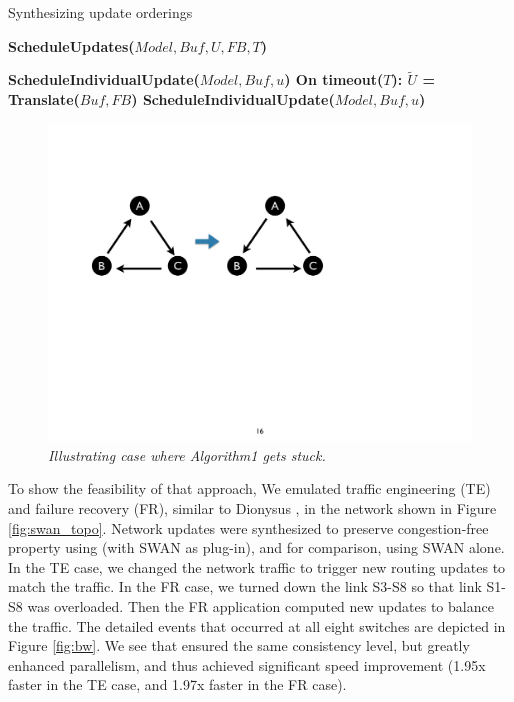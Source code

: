 \begin{algorithm}[t]
  \small
\caption{Synthesizing update orderings}
\bf{ScheduleUpdates}($Model, Buf, U, FB, T$)
\begin{algorithmic} 
        \State \bf{ScheduleIndividualUpdate($Model, Buf, u$)}
\EndFor
\State 
\State \bf{On timeout($T$):}
\State $\tilde{U}$ = \bf{Translate($Buf, FB$)}
        \State \bf{ScheduleIndividualUpdate($Model, Buf, u$)}
\EndFor
\label{alg:synthesize}
\end{algorithmic}  
\end{algorithm}

\begin{figure}[!ht]
  \centering
  \includegraphics[width=0.7\columnwidth]{figs/triangle}
  \caption{\em \small Illustrating case where Algorithm1 gets stuck.}
  \label{fig:example}
\end{figure}
\fi

To show the feasibility of that approach,
We emulated traffic engineering (TE) and failure recovery (FR), similar to Dionysus \cite{jin2014dynamic}, in the network shown in Figure \ref{fig:swan_topo}. Network updates were synthesized to preserve congestion-free property using \name (with SWAN as plug-in), and for comparison, using SWAN alone. In the TE case, we changed the network traffic to trigger new routing updates to match the traffic. In the FR case, we turned down the link S3-S8 so that link S1-S8 was overloaded. Then the FR application computed new updates to balance the traffic.
The detailed events that occurred at all eight switches are depicted in Figure \ref{fig:bw}. We see that \name ensured the same consistency level, but greatly enhanced parallelism, and thus achieved significant speed improvement (1.95x faster in the TE case, and 1.97x faster in the FR case).

